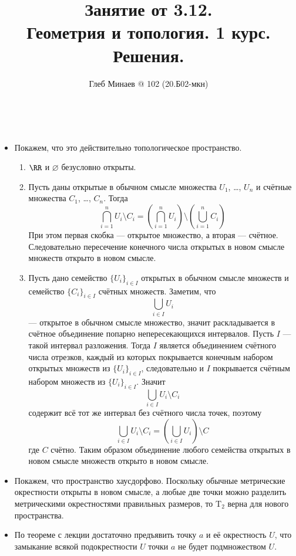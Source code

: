\documentclass[12pt,a4paper]{article}
\title{Занятие от 3.12.\\Геометрия и топология. 1 курс.\\Решения.}
\author{Глеб Минаев @ 102 (20.Б02-мкн)}
\newcommand{\T}{\ensuremath{\mathrm{T}}\xspace}
\begin{document}
    \maketitle

    \begin{problem}{48}\ 
        \begin{itemize}
            \item Покажем, что это действительно топологическое пространство.
                \begin{enumerate}
                    \item $\RR$ и $\varnothing$ безусловно открыты.
                    \item Пусть даны открытые в обычном смысле множества $U_1$, \dots, $U_n$ и счётные множества $C_1$, \dots, $C_n$. Тогда
                        \[
                            \bigcap_{i=1}^n U_i \setminus C_i
                            = \left(\bigcap_{i=1}^n U_i\right) \setminus \left(\bigcup_{i=1}^n C_i\right)
                        \]
                        При этом первая скобка --- открытое множество, а вторая --- счётное. Следовательно пересечение конечного числа открытых в новом смысле множеств открыто в новом смысле.
                    \item Пусть дано семейство $\{U_i\}_{i \in I}$ открытых в обычном смысле множеств и семейство $\{C_i\}_{i \in I}$ счётных множеств. Заметим, что
                        \[\bigcup_{i \in I} U_i\]
                        --- открытое в обычном смысле множество, значит раскладывается в счётное объединение попарно непересекающихся интервалов. Пусть $I$ --- такой интервал разложения. Тогда $I$ является объединением счётного числа отрезков, каждый из которых покрывается конечным набором открытых множеств из $\{U_i\}_{i \in I}$, следовательно и $I$ покрывается счётным набором множеств из $\{U_i\}_{i \in I}$. Значит
                        \[\bigcup_{i \in I} U_i \setminus C_i\]
                        содержит всё тот же интервал без счётного числа точек, поэтому
                        \[\bigcup_{i \in I} U_i \setminus C_i = \left(\bigcup_{i \in I} U_i\right) \setminus C\]
                        где $C$ счётно. Таким образом объединение любого семейства открытых в новом смысле множеств открыто в новом смысле.
                \end{enumerate}
            \item Покажем, что пространство хаусдорфово. Поскольку обычные метрические окрестности открыты в новом смысле, а любые две точки можно разделить метрическими окрестностями правильных размеров, то $\T_2$ верна для нового пространства.
            \item По теореме с лекции достаточно предъявить точку $a$ и её окрестность $U$, что замыкание всякой подокрестности $U$ точки $a$ не будет подмножеством $U$.


\end{itemize}
\end{problem}
\end{document}
